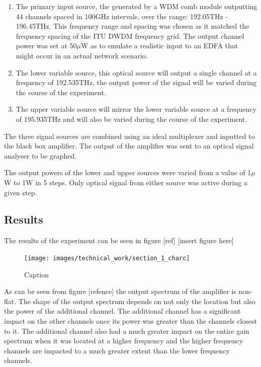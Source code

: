 \begin{enumerate}
    \item The primary input source, the generated by a WDM comb module outputting 44 channels spaced in 100GHz intervals, over the range: 192.05THz - 196.45THz. This frequency range and spacing was chosen as it matched the frequency spacing of the ITU DWDM frequency grid. The output channel power was set at 50$\mu$W as to emulate a realistic input to an EDFA that might occur in an actual network scenario. \\
    
    \item The lower variable source, this optical source will output a single channel at a frequency of 192.535THz, the output power of the signal will be varied during the course of the experiment.\\
    
    \item The upper variable source will mirror the lower variable source at a frequency of 195.935THz and will also be varied during the course of the experiment.  
\end{enumerate}


The three signal sources are combined using an ideal multiplexer and inputted to the black box amplifier. The output of the amplifier was sent to an optical signal analyser to be graphed.

The output powers of the lower and upper sources were varied from a value of 1$\mu$W to 1W in 5 steps. Only optical signal from either source was active during a given step.

\subsection{Results}
The results of the experiment can be seen in figure [ref]
[insert figure here]

\begin{figure}
    \centering
    \texttt{[image: images/technical\_work/section\_1\_charc]}
    \caption{Caption}
    \label{fig:my_label}
\end{figure}


As can be seen from figure [refence] the output spectrum of the amplifier is non-flat. The shape of the output spectrum depends on not only the location but also the power of the additional channel. The additional channel has a significant impact on the other channels once its power was greater than the channels closest to it. The additional channel also had a much greater impact on the entire gain spectrum when it was located at a higher frequency and the higher frequency channels are impacted to a much greater extent than the lower frequency channels.

